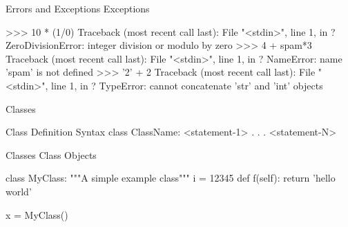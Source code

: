 \documentclass[11pt]{beamer}
\begin{document}
\begin{frame}[containsverbatim]{Errors and Exceptions}
Exceptions
\begin{python}
>>> 10 * (1/0)
Traceback (most recent call last):
  File "<stdin>", line 1, in ?
ZeroDivisionError: integer division or modulo by zero
>>> 4 + spam*3
Traceback (most recent call last):
  File "<stdin>", line 1, in ?
NameError: name 'spam' is not defined
>>> '2' + 2
Traceback (most recent call last):
  File "<stdin>", line 1, in ?
TypeError: cannot concatenate 'str' and 'int' objects
\end{python}
\end{frame}

\begin{frame}[containsverbatim]{Classes}
\begin{python}
Class Definition Syntax
class ClassName:
    <statement-1>
    .
    .
    .
    <statement-N>
\end{python}
\end{frame}

\begin{frame}[containsverbatim]{Classes}
Class Objects
\begin{python}
class MyClass:
    """A simple example class"""
    i = 12345
    def f(self):
        return 'hello world'

x = MyClass()

\end{python}
\end{frame}
\end{document}
